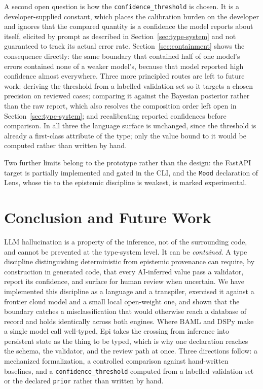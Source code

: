 \documentclass[sigconf]{acmart}
\begin{document}
A second open question is how the \texttt{confidence\_\allowbreak{}threshold} is chosen. It is a developer-supplied constant, which places the calibration burden on the developer and ignores that the compared quantity is a confidence the model reports about itself, elicited by prompt as described in Section~\ref{sec:type-system} and not guaranteed to track its actual error rate. Section~\ref{sec:containment} shows the consequence directly: the same boundary that contained half of one model's errors contained none of a weaker model's, because that model reported high confidence almost everywhere. Three more principled routes are left to future work: deriving the threshold from a labelled validation set so it targets a chosen precision on reviewed cases; comparing it against the Bayesian posterior rather than the raw report, which also resolves the composition order left open in Section~\ref{sec:type-system}; and recalibrating reported confidences before comparison. In all three the language surface is unchanged, since the threshold is already a first-class attribute of the type; only the value bound to it would be computed rather than written by hand.

Two further limits belong to the prototype rather than the design: the FastAPI target is partially implemented and gated in the CLI, and the \texttt{Mood} declaration of Lens, whose tie to the epistemic discipline is weakest, is marked experimental.

\section{Conclusion and Future Work}

LLM hallucination is a property of the inference, not of the surrounding code, and cannot be prevented at the type-system level. It can be \emph{contained}. A type discipline distinguishing deterministic from epistemic provenance can require, by construction in generated code, that every AI-inferred value pass a validator, report its confidence, and surface for human review when uncertain. We have implemented this discipline as a language and a transpiler, exercised it against a frontier cloud model and a small local open-weight one, and shown that the boundary catches a misclassification that would otherwise reach a database of record and holds identically across both engines. Where BAML and DSPy make a single model call well-typed, Epi takes the crossing from inference into persistent state as the thing to be typed, which is why one declaration reaches the schema, the validator, and the review path at once. Three directions follow: a mechanized formalization, a controlled comparison against hand-written baselines, and a \texttt{confidence\_\allowbreak{}threshold} computed from a labelled validation set or the declared \texttt{prior} rather than written by hand.
\end{document}
